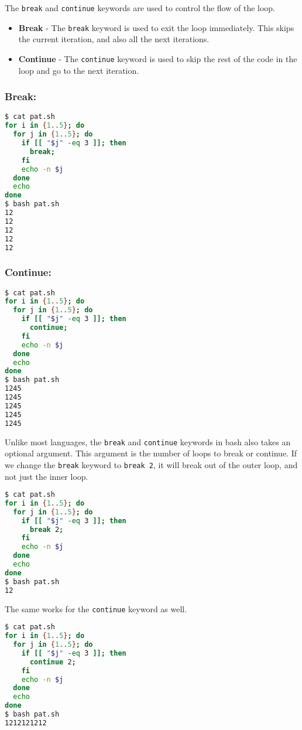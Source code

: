 The \lstinline{break} and \lstinline{continue} keywords are used to control the flow of the loop.

\begin{itemize}
    \item \textbf{Break} - The \lstinline{break} keyword is used to exit the loop immediately. This skips the current iteration, and also all the next iterations.
    \item \textbf{Continue} - The \lstinline{continue} keyword is used to skip the rest of the code in the loop and go to the next iteration.
\end{itemize}

\subsubsection{Break:}
\begin{lstlisting}[language=bash]
$ cat pat.sh
for i in {1..5}; do
  for j in {1..5}; do
    if [[ "$j" -eq 3 ]]; then
      break;
    fi
    echo -n $j
  done
  echo
done
$ bash pat.sh
12
12
12
12
12
\end{lstlisting}

\subsubsection{Continue:}
\begin{lstlisting}[language=bash]
$ cat pat.sh
for i in {1..5}; do
  for j in {1..5}; do
    if [[ "$j" -eq 3 ]]; then
      continue;
    fi
    echo -n $j
  done
  echo
done
$ bash pat.sh
1245
1245
1245
1245
1245
\end{lstlisting}

Unlike most languages, the \lstinline{break} and \lstinline{continue} keywords in bash also takes an optional argument.
This argument is the number of loops to break or continue.
If we change the \lstinline{break} keyword to \lstinline{break 2}, it will break out of the outer loop, and not just the inner loop.

\begin{lstlisting}[language=bash]
$ cat pat.sh
for i in {1..5}; do
  for j in {1..5}; do
    if [[ "$j" -eq 3 ]]; then
      break 2;
    fi
    echo -n $j
  done
  echo
done
$ bash pat.sh
12
\end{lstlisting}

The same works for the \lstinline{continue} keyword as well.

\begin{lstlisting}[language=bash]
$ cat pat.sh
for i in {1..5}; do
  for j in {1..5}; do
    if [[ "$j" -eq 3 ]]; then
      continue 2;
    fi
    echo -n $j
  done
  echo
done
$ bash pat.sh
1212121212
\end{lstlisting}

